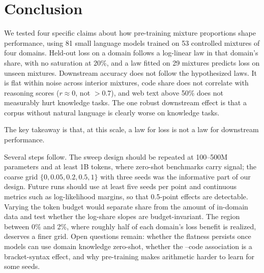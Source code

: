 \section{Conclusion}
\label{sec:conclusion}

We tested four specific claims about how pre-training mixture proportions shape performance, using 81 small language models trained on 53 controlled mixtures of four domains.
Held-out loss on a domain follows a log-linear law in that domain's share, with no saturation at 20\%, and a law fitted on 29 mixtures predicts loss on unseen mixtures.
Downstream accuracy does not follow the hypothesized laws.
It is flat within noise across interior mixtures, code share does not correlate with reasoning scores ($r \approx 0$, not $> 0.7$), and web text above 50\% does not measurably hurt knowledge tasks.
The one robust downstream effect is that a corpus without natural language is clearly worse on knowledge tasks.

The key takeaway is that, at this scale, a law for loss is not a law for downstream performance.

Several steps follow.
The sweep design should be repeated at 100--500M parameters and at least 1B tokens, where zero-shot benchmarks carry signal; the coarse grid $\{0, 0.05, 0.2, 0.5, 1\}$ with three seeds was the informative part of our design.
Future runs should use at least five seeds per point and continuous metrics such as log-likelihood margins, so that 0.5-point effects are detectable.
Varying the token budget would separate share from the amount of in-domain data and test whether the log-share slopes are budget-invariant.
The region between 0\% and 2\%, where roughly half of each domain's loss benefit is realized, deserves a finer grid.
Open questions remain: whether the flatness persists once models can use domain knowledge zero-shot, whether the \listops--code association is a bracket-syntax effect, and why pre-training makes arithmetic harder to learn for some seeds.
